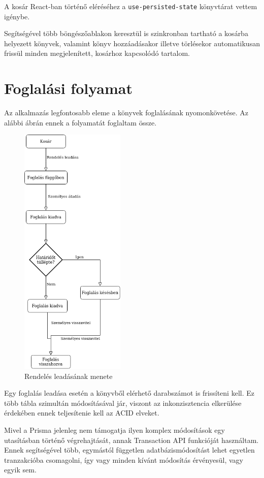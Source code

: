 A kosár React-ban történő eléréséhez a \lstinline|use-persisted-state| könyvtárat vettem igénybe.

Segítségével több böngészőablakon keresztül is szinkronban tartható a kosárba helyezett könyvek,
valamint könyv hozzáadásakor illetve törlésekor automatikusan frissül minden megjelenített, kosárhoz kapcsolódó tartalom.

\section{Foglalási folyamat}

Az alkalmazás legfontosabb eleme a könyvek foglalásának nyomonkövetése. Az alábbi ábrán ennek a folyamatát foglaltam össze.

\begin{figure}[!ht]
  \centering
  \includegraphics[width=50mm, keepaspectratio]{figures/order-flowchart.png}
  \caption{Rendelés leadásának menete}
  \label{fig:OrderChart}
\end{figure}

Egy foglalás leadása esetén a könyvből elérhető darabszámot is frissíteni kell. Ez több tábla szimultán módosításával jár,
viszont az inkonzisztencia elkerülése érdekében ennek teljesítenie kell az ACID elveket.

Mivel a Prisma jelenleg nem támogatja ilyen komplex módosítások egy utasításban történő végrehajtását, annak Transaction API
funkcióját használtam. Ennek segítségével több, egymástól független adatbázismódosítást lehet egyetlen tranzakcióba csomagolni,
így vagy minden kívánt módosítás érvényesül, vagy egyik sem.

